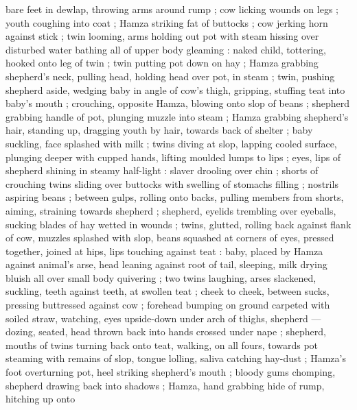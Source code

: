 bare feet in dewlap, throwing arms around rump ; cow licking wounds on legs ; youth coughing into coat ; Hamza striking fat of buttocks ; cow jerking horn against stick ; twin looming, arms holding out pot with steam hissing over disturbed water bathing all of upper body gleaming : naked child, tottering, hooked onto leg of twin ; twin putting pot down on hay ; Hamza grabbing shepherd's neck, pulling head, holding head over pot, in steam ; twin, pushing shepherd aside, wedging baby in angle of cow's thigh, gripping, stuffing teat into baby's mouth ; crouching, opposite Hamza, blowing onto slop of beans ; shepherd grabbing handle of pot, plunging muzzle into steam ; Hamza grabbing shepherd's hair, standing up, dragging youth by hair, towards back of shelter ; baby suckling, face splashed with milk ; twins diving at slop, lapping cooled surface, plunging deeper with cupped hands, lifting moulded lumps to lips ; eyes, lips of shepherd shining in steamy half-light : slaver drooling over chin ; shorts of crouching twins sliding over buttocks with swelling of stomachs filling ; nostrils aspiring beans ; between gulps, rolling onto backs, pulling members from shorts, aiming, straining towards shepherd ; shepherd, eyelids trembling over eyeballs, sucking blades of hay wetted in wounds ; twins, glutted, rolling back against flank of cow, muzzles splashed with slop, beans squashed at corners of eyes, pressed together, joined at hips, lips touching against teat : baby, placed by Hamza against animal's arse, head leaning against root of tail, sleeping, milk drying bluish all over small body quivering ; two twins laughing, arses slackened, suckling, teeth against teeth, at swollen teat ; cheek to cheek, between sucks, pressing buttressed against cow ; forehead bumping on ground carpeted with soiled straw, watching, eyes upside-down under arch of thighs, shepherd --- dozing, seated, head thrown back into hands crossed under nape ; shepherd, mouths of twins turning back onto teat, walking, on all fours, towards pot steaming with remains of slop, tongue lolling, saliva catching hay-dust ; Hamza's foot overturning pot, heel striking shepherd's mouth ; bloody gums chomping, shepherd drawing back into shadows ; Hamza, hand grabbing hide of rump, hitching up onto 
